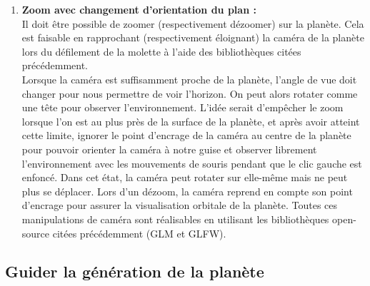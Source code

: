 \documentclass[a4paper]{article}
\begin{document}
\begin{enumerate}
        \item \textbf{Zoom avec changement d'orientation du plan :} \\
        Il doit être possible de zoomer (respectivement dézoomer) sur la planète. Cela est faisable en rapprochant (respectivement éloignant) la caméra de la planète lors du défilement de la molette à l'aide des bibliothèques citées précédemment.\\
        Lorsque la caméra est suffisamment proche de la planète, l'angle de vue doit changer pour nous permettre de voir l'horizon. On peut alors rotater comme une tête pour observer l'environnement. L'idée serait d'empêcher le zoom lorsque l'on est au plus près de la surface de la planète, et après avoir atteint cette limite, ignorer le point d'encrage de la caméra au centre de la planète pour pouvoir orienter la caméra à notre guise et observer librement l'environnement avec les mouvements de souris pendant que le clic gauche est enfoncé. Dans cet état, la caméra peut rotater sur elle-même mais ne peut plus se déplacer. Lors d'un dézoom, la caméra reprend en compte son point d'encrage pour assurer la visualisation orbitale de la planète. Toutes ces manipulations de caméra sont réalisables en utilisant les bibliothèques open-source citées précédemment (GLM et GLFW).
        
\end{enumerate}


\subsection{Guider la génération de la planète}
\end{document}
